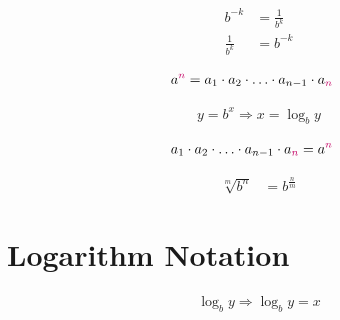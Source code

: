 \documentclass[20150903-160354-rs2.2-MarksMathNotebook.tex]{subfiles}
\begin{document}
\begin{notations}
\begin{align}
b^{-k}&= \frac{1}{b^k} \label{eq:pone1}\\
\frac{1}{b^k}&=b^{-k}  \label{eq:pone2}
\end{align}
\end{notations}

\begin{notations}
\begin{align}
a^{\alert{n}} &= a_1 \cdot a_2 \cdot \ldots \cdot a_{n-1} \cdot a_{\alert{n}} \label{eq:potf}
\end{align}
\end{notations}

\begin{notations}
\begin{align}
y=b^x \Rightarrow x=\log_b y \label{eq:potl}
\end{align}
\end{notations}

\begin{notations}
\begin{align}
a_1 \cdot a_2 \cdot \ldots \cdot a_{n-1} \cdot a_{\alert{n}} &= a^{\alert{n}} \label{eq:ftpo}
\end{align}
\end{notations}

\begin{notations}
\begin{align}
\sqrt[m]{b^n} &= b^{\frac{n}{m}}	 \label{eq:rtpo}
\end{align}
\end{notations}


\section{Logarithm Notation}

\begin{notations}
\begin{align}
\log_b y \Rightarrow \log_b y=x	 \label{eq:lev}
\end{align}
\end{notations}
\end{document}
